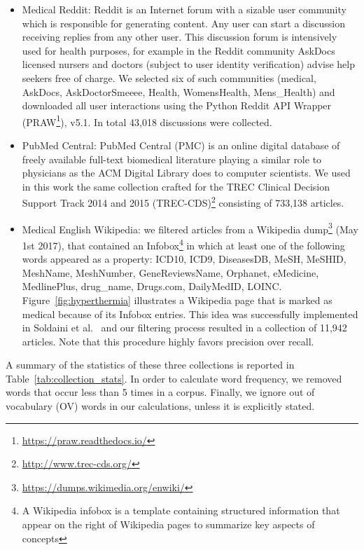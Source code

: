 \documentclass[runningheads,a4paper]{llncs}
\begin{document}
\begin{itemize}
\item Medical Reddit: Reddit is an Internet forum with a sizable user community which is responsible for generating content. Any user can start a discussion receiving replies from any other user.
This discussion forum is intensively used for health purposes, for example in the Reddit community AskDocs licensed nursers and doctors (subject to user identity verification) advise help seekers free of charge. We selected six of such communities (medical, AskDocs, AskDoctorSmeeee, Health, WomensHealth, Mens\_Health) and downloaded all user interactions using the Python Reddit API Wrapper (PRAW\footnote{\url{https://praw.readthedocs.io/}}), v5.1. In total 43,018 discussions were collected.

\item PubMed Central: PubMed Central (PMC) is an online digital database of freely available full-text biomedical literature playing a similar role to physicians as the ACM Digital Library does to computer scientists. We used in this work the same collection crafted for the TREC Clinical Decision Support Track 2014 and 2015 (TREC-CDS)\footnote{\url{http://www.trec-cds.org/}} consisting of 733,138 articles. 
 
\item Medical English Wikipedia: we filtered articles from a Wikipedia dump\footnote{\url{https://dumps.wikimedia.org/enwiki/}} (May 1st 2017), that contained an Infobox\footnote{A Wikipedia infobox is a template containing structured information that appear on the right of Wikipedia pages to summarize key aspects of concepts} in which at least one of the following words appeared as a property: ICD10, ICD9, DiseasesDB, MeSH, MeSHID, MeshName, MeshNumber, GeneReviewsName, Orphanet, eMedicine, MedlinePlus, drug\_name, Drugs.com, DailyMedID, LOINC.
Figure~\ref{fig:hyperthermia} illustrates a Wikipedia page that is marked as medical because of its Infobox entries.
This idea was successfully implemented in Soldaini et al.~\cite{soldaini15} and our filtering process resulted in a collection of 11,942 articles. 
Note that this procedure highly favors precision over recall.
   
\end{itemize}

A summary of the statistics of these three collections is reported in Table~\ref{tab:collection_stats}.
In order to calculate word frequency, we removed words that occur less than 5 times in a corpus.
Finally, we ignore out of vocabulary (OV) words in our calculations, unless it is explicitly stated.
\end{document}
